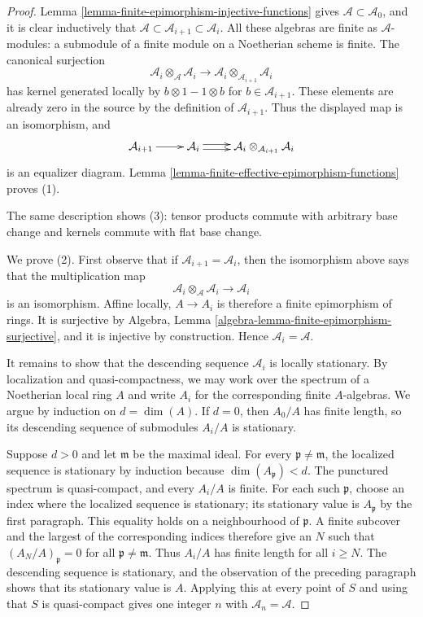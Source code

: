 \begin{proof}
Lemma \ref{lemma-finite-epimorphism-injective-functions} gives
$\mathcal{A} \subset \mathcal{A}_0$, and it is clear inductively that
$\mathcal{A} \subset \mathcal{A}_{i + 1} \subset \mathcal{A}_i$.
All these algebras are finite as $\mathcal{A}$-modules: a submodule of a
finite module on a Noetherian scheme is finite. The canonical surjection
$$
\mathcal{A}_i \otimes_{\mathcal{A}} \mathcal{A}_i
\longrightarrow
\mathcal{A}_i \otimes_{\mathcal{A}_{i + 1}} \mathcal{A}_i
$$
has kernel generated locally by
$b \otimes 1 - 1 \otimes b$ for $b \in \mathcal{A}_{i + 1}$. These
elements are already zero in the source by the definition of
$\mathcal{A}_{i + 1}$. Thus the displayed map is an isomorphism, and
$$
\xymatrix{
\mathcal{A}_{i + 1} \ar[r] &
\mathcal{A}_i \ar@<0.5ex>[r] \ar@<-0.5ex>[r] &
\mathcal{A}_i \otimes_{\mathcal{A}_{i + 1}} \mathcal{A}_i
}
$$
is an equalizer diagram. Lemma
\ref{lemma-finite-effective-epimorphism-functions} proves (1).

The same description shows (3): tensor products commute with arbitrary base
change and kernels commute with flat base change.

\medskip\noindent
We prove (2). First observe that if
$\mathcal{A}_{i + 1} = \mathcal{A}_i$, then the isomorphism above says that
the multiplication map
$$
\mathcal{A}_i \otimes_{\mathcal{A}} \mathcal{A}_i
\longrightarrow \mathcal{A}_i
$$
is an isomorphism. Affine locally, $A \to A_i$ is therefore a finite
epimorphism of rings. It is surjective by Algebra, Lemma
\ref{algebra-lemma-finite-epimorphism-surjective}, and it is injective by
construction. Hence $\mathcal{A}_i = \mathcal{A}$.

It remains to show that the descending sequence $\mathcal{A}_i$ is locally
stationary. By localization and quasi-compactness, we may work over the
spectrum of a Noetherian local ring $A$ and write $A_i$ for the corresponding
finite $A$-algebras. We argue by induction on $d = \dim(A)$. If $d = 0$,
then $A_0/A$ has finite length, so its descending sequence of submodules
$A_i/A$ is stationary.

Suppose $d > 0$ and let $\mathfrak m$ be the maximal ideal. For every
$\mathfrak p \neq \mathfrak m$, the localized sequence is stationary by
induction because $\dim(A_{\mathfrak p}) < d$. The punctured spectrum is
quasi-compact, and every $A_i/A$ is finite. For each such $\mathfrak p$,
choose an index where the localized sequence is stationary; its stationary
value is $A_{\mathfrak p}$ by the first paragraph. This equality holds on a
neighbourhood of $\mathfrak p$. A finite subcover and the largest of the
corresponding indices therefore give an $N$ such that
$(A_N/A)_{\mathfrak p} = 0$ for all
$\mathfrak p \neq \mathfrak m$. Thus $A_i/A$ has finite length for all
$i \geq N$. The descending sequence is stationary, and the observation of
the preceding paragraph shows that its stationary value is $A$. Applying
this at every point of $S$ and using that $S$ is quasi-compact gives one
integer $n$ with $\mathcal{A}_n = \mathcal{A}$.


\end{proof}
